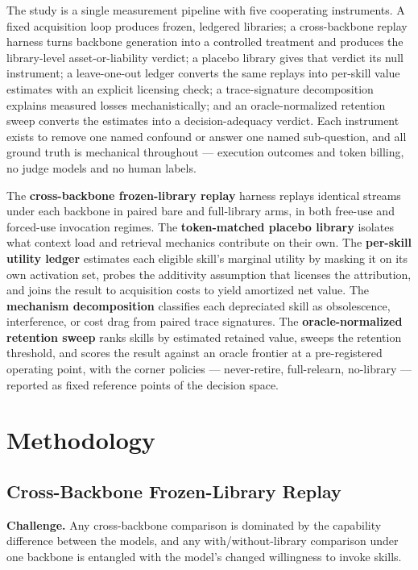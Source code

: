 \documentclass[11pt]{article}
\begin{document}
The study is a single measurement pipeline with five cooperating instruments. A fixed acquisition loop produces frozen, ledgered libraries; a cross-backbone replay harness turns backbone generation into a controlled treatment and produces the library-level asset-or-liability verdict; a placebo library gives that verdict its null instrument; a leave-one-out ledger converts the same replays into per-skill value estimates with an explicit licensing check; a trace-signature decomposition explains measured losses mechanistically; and an oracle-normalized retention sweep converts the estimates into a decision-adequacy verdict. Each instrument exists to remove one named confound or answer one named sub-question, and all ground truth is mechanical throughout --- execution outcomes and token billing, no judge models and no human labels.

The \textbf{cross-backbone frozen-library replay} harness replays identical streams under each backbone in paired bare and full-library arms, in both free-use and forced-use invocation regimes. The \textbf{token-matched placebo library} isolates what context load and retrieval mechanics contribute on their own. The \textbf{per-skill utility ledger} estimates each eligible skill's marginal utility by masking it on its own activation set, probes the additivity assumption that licenses the attribution, and joins the result to acquisition costs to yield amortized net value. The \textbf{mechanism decomposition} classifies each depreciated skill as obsolescence, interference, or cost drag from paired trace signatures. The \textbf{oracle-normalized retention sweep} ranks skills by estimated retained value, sweeps the retention threshold, and scores the result against an oracle frontier at a pre-registered operating point, with the corner policies --- never-retire, full-relearn, no-library --- reported as fixed reference points of the decision space.

\section{Methodology}

\subsection{Cross-Backbone Frozen-Library Replay}

\textbf{Challenge.} Any cross-backbone comparison is dominated by the capability difference between the models, and any with/without-library comparison under one backbone is entangled with the model's changed willingness to invoke skills.
\end{document}
